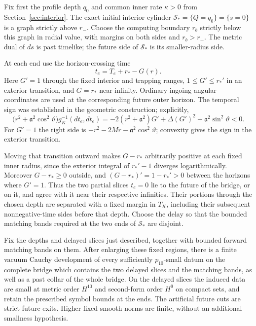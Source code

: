 Fix first the profile depth $q_0$ and common inner rate $\kappa>0$ from
Section~\ref{sec:interior}. The exact initial interior cylinder
$\mathcal S_* =\{Q=q_0\}=\{s=0\}$ is a graph strictly above $r_-$.
Choose the computing boundary $r_b$ strictly below this graph in radial
value, with margins on both sides and $r_b>r_-$. The metric dual of
$ds$ is past timelike; the future side of $\mathcal S_*$ is its
smaller-radius side.

At each end use the horizon-crossing time
\begin{equation}\label{cmp:bent-time}
 t_e=T_e+r_*-G(r).
\end{equation}
Here $G'=1$ through the fixed interior and trapping ranges,
$1\leq G'\leq r_*'$ in an exterior transition, and $G=r_*$ near
infinity. Ordinary ingoing angular coordinates are used at the
corresponding future outer horizon. The temporal sign was established
in the geometric construction; explicitly,
\begin{equation}\label{cmp:temporal-sign}
 \bigl(r^2+\mathfrak a^2\cos^2\vartheta\bigr)
       g_K^{-1}(dt_e,dt_e)
 =-2(r^2+\mathfrak a^2)G'+\Delta(G')^2
       +\mathfrak a^2\sin^2\vartheta<0.
\end{equation}
For $G'=1$ the right side is
$-r^2-2Mr-\mathfrak a^2\cos^2\vartheta$; convexity gives the sign in
the exterior transition.

Moving that transition outward makes $G-r_*$ arbitrarily positive at
each fixed inner radius, since the exterior integral of $r_*'-1$
diverges logarithmically. Moreover $G-r_*\geq0$ outside, and
$(G-r_*)'=1-r_*'>0$ between the horizons where $G'=1$. Thus the two
partial slices $t_e=0$ lie to the future of the bridge, or on it, and
agree with it near their respective infinities. Their portions through
the chosen depth are separated with a fixed margin in $T_K$, including
their subsequent nonnegative-time sides before that depth. Choose the
delay so that the bounded matching bands required at the two ends of
$\mathcal S_*$ are disjoint.

\begin{lemma}\label{cmp:finite-range}
Fix the depths and delayed slices just described, together with bounded
forward matching bands on them. After enlarging these fixed regions,
there is a finite vacuum Cauchy development of every sufficiently
$p_{10}$-small datum on the complete bridge which contains the two
delayed slices and the matching bands, as well as a past collar of the
whole bridge. On the delayed slices the induced data are small at
metric order $H^{10}$ and second-form order $H^9$ on compact sets, and
retain the prescribed symbol bounds at the ends. The artificial future
cuts are strict future exits. Higher fixed smooth norms are finite,
without an additional smallness hypothesis.
\end{lemma}

